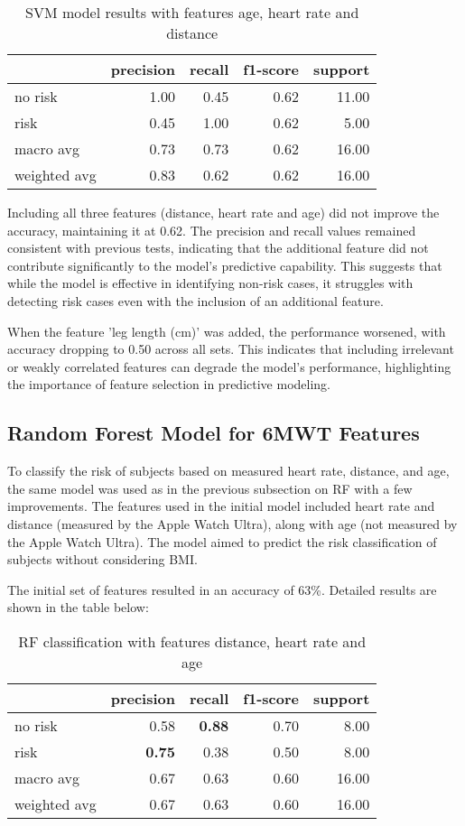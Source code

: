 \FloatBarrier
\begin{table}[H]
\centering
\begin{tabular}{lrrrr}
\toprule
{} & precision & recall & f1-score & support \\
\midrule
no risk & 1.00 & 0.45 & 0.62 & 11.00 \\
risk & 0.45 & 1.00 & 0.62 & 5.00 \\
macro avg & 0.73 & 0.73 & 0.62 & 16.00 \\
weighted avg & 0.83 & 0.62 & 0.62 & 16.00 \\
\bottomrule
\end{tabular}
\caption{SVM model results with features age, heart rate and distance}
\label{table:svmageHRdist}
\end{table}
\FloatBarrier

Including all three features (distance, heart rate and age) did not improve the accuracy, maintaining it at 0.62. The precision and recall values remained consistent with previous tests, indicating that the additional feature did not contribute significantly to the model's predictive capability. This suggests that while the model is effective in identifying non-risk cases, it struggles with detecting risk cases even with the inclusion of an additional feature.

When the feature 'leg length (cm)' was added, the performance worsened, with accuracy dropping to 0.50 across all sets. This indicates that including irrelevant or weakly correlated features can degrade the model's performance, highlighting the importance of feature selection in predictive modeling.

\subsection{Random Forest Model for 6MWT Features}

To classify the risk of subjects based on measured heart rate, distance, and age, the same model was used as in the previous subsection on RF with a few improvements. The features used in the initial model included heart rate and distance (measured by the Apple Watch Ultra), along with age (not measured by the Apple Watch Ultra). The model aimed to predict the risk classification of subjects without considering BMI.

The initial set of features resulted in an accuracy of 63\%. Detailed results are shown in the table below:

\begin{table}[H]
\centering
\begin{tabular}{lrrrr}
\toprule
{} & precision & recall & f1-score & support \\
\midrule
no risk & 0.58 & \textbf{0.88} & 0.70 & 8.00 \\
risk & \textbf{0.75} & 0.38 & 0.50 & 8.00 \\
macro avg & 0.67 & 0.63 & 0.60 & 16.00 \\
weighted avg & 0.67 & 0.63 & 0.60 & 16.00 \\
\bottomrule
\end{tabular}
\caption{RF classification with features distance, heart rate and age}
\label{table:RFdistHeartrateage}
\end{table}

